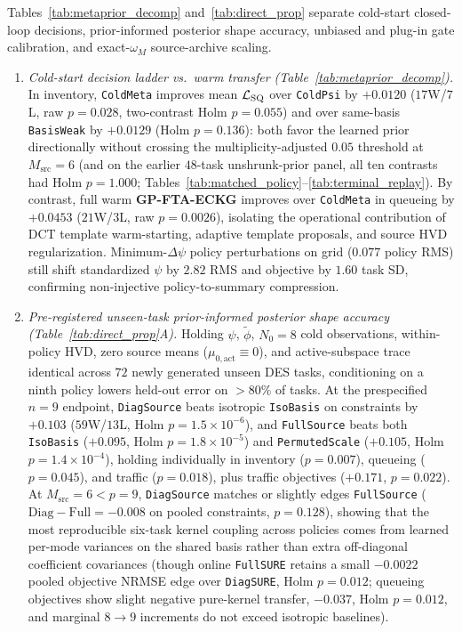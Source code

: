 Tables~\ref{tab:metaprior_decomp} and~\ref{tab:direct_prop} separate cold-start closed-loop decisions, prior-informed posterior shape accuracy, unbiased and plug-in gate calibration, and exact-$\omega_M$ source-archive scaling.
\begin{enumerate}
  \item \emph{Cold-start decision ladder vs.\ warm transfer (Table~\ref{tab:metaprior_decomp}).} In inventory, \texttt{ColdMeta} improves mean $\mathcal{L}_{\mathrm{SQ}}$ over \texttt{ColdPsi} by $+0.0120$ ($17$W/$7$L, raw $p=0.028$, two-contrast Holm $p=0.055$) and over same-basis \texttt{BasisWeak} by $+0.0129$ (Holm $p=0.136$): both favor the learned prior directionally without crossing the multiplicity-adjusted $0.05$ threshold at $M_{\mathrm{src}}=6$ (and on the earlier $48$-task unshrunk-prior panel, all ten contrasts had Holm $p=1.000$; Tables~\ref*{tab:matched_policy}--\ref*{tab:terminal_replay}). By contrast, full warm \textbf{GP-FTA-ECKG} improves over \texttt{ColdMeta} in queueing by $+0.0453$ ($21$W/$3$L, raw $p=0.0026$), isolating the operational contribution of DCT template warm-starting, adaptive template proposals, and source HVD regularization. Minimum-$\Delta\psi$ policy perturbations on grid ($0.077$ policy RMS) still shift standardized $\psi$ by $2.82$ RMS and objective by $1.60$ task SD, confirming non-injective policy-to-summary compression.
  \item \emph{Pre-registered unseen-task prior-informed posterior shape accuracy (Table~\ref{tab:direct_prop}A).} Holding $\psi$, $\tilde{\phi}$, $N_0=8$ cold observations, within-policy HVD, zero source means ($\mu_{0,\mathrm{act}}\equiv 0$), and active-subspace trace identical across $72$ newly generated unseen DES tasks, conditioning on a ninth policy lowers held-out error on $>80\%$ of tasks. At the prespecified $n=9$ endpoint, \texttt{DiagSource} beats isotropic \texttt{IsoBasis} on constraints by $+0.103$ ($59$W/$13$L, Holm $p = 1.5\times 10^{-6}$), and \texttt{FullSource} beats both \texttt{IsoBasis} ($+0.095$, Holm $p = 1.8\times 10^{-5}$) and \texttt{PermutedScale} ($+0.105$, Holm $p = 1.4\times 10^{-4}$), holding individually in inventory ($p=0.007$), queueing ($p=0.045$), and traffic ($p=0.018$), plus traffic objectives ($+0.171$, $p=0.022$). At $M_{\mathrm{src}}=6 < p=9$, \texttt{DiagSource} matches or slightly edges \texttt{FullSource} ($\text{Diag}-\text{Full} = -0.008$ on pooled constraints, $p=0.128$), showing that the most reproducible six-task kernel coupling across policies comes from learned per-mode variances on the shared basis rather than extra off-diagonal coefficient covariances (though online \texttt{FullSURE} retains a small $-0.0022$ pooled objective NRMSE edge over \texttt{DiagSURE}, Holm $p=0.012$; queueing objectives show slight negative pure-kernel transfer, $-0.037$, Holm $p=0.012$, and marginal $8\to 9$ increments do not exceed isotropic baselines).

\end{enumerate}
